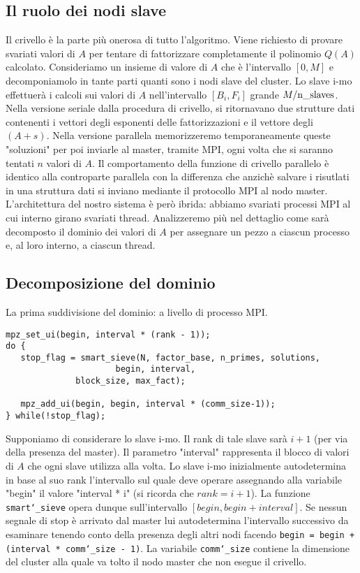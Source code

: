 \subsection{Il ruolo dei nodi slave}
Il crivello è la parte più onerosa di tutto l'algoritmo. Viene
richiesto di provare svariati valori di $A$ per tentare di fattorizzare
completamente il polinomio $Q(A)$ calcolato. Consideriamo un
insieme di valore di $A$ che è l'intervallo $[0, M]$ e decomponiamolo in
tante parti quanti sono i nodi slave del cluster. Lo slave i-mo
effettuerà i calcoli sui valori di $A$ nell'intervallo
$[B_i, F_i]$ grande $M/\mathrm{n\char`_slaves}$. 
Nella versione seriale dalla procedura di crivello, si 
ritornavano due strutture dati contenenti i vettori degli esponenti
delle fattorizzazioni e il vettore degli $(A + s)$. Nella versione
parallela memorizzeremo temporaneamente queste "soluzioni" per poi
inviarle al master, tramite MPI, ogni volta che si saranno tentati $n$ valori
di $A$. Il comportamento della funzione di crivello parallelo è identico
alla controparte parallela con la differenza che anzichè salvare i risutlati
in una struttura dati si inviano mediante il protocollo MPI al nodo
master. L'architettura del nostro sistema è però ibrida: abbiamo svariati
processi MPI al cui interno girano svariati thread. Analizzeremo più nel
dettaglio come sarà decomposto il dominio dei valori di $A$ per
assegnare un pezzo a ciascun processo e, al loro interno, a ciascun
thread.
\subsection{Decomposizione del dominio}
La prima suddivisione del dominio: a livello di processo MPI.
\begin{lstlisting}
mpz_set_ui(begin, interval * (rank - 1));
do {
   stop_flag = smart_sieve(N, factor_base, n_primes, solutions,
                	  begin, interval,
		  	  block_size, max_fact);

   mpz_add_ui(begin, begin, interval * (comm_size-1));
} while(!stop_flag);
\end{lstlisting}
Supponiamo di considerare lo slave i-mo. Il rank di tale slave sarà
$i+1$ (per via della presenza del master). Il parametro "interval"
rappresenta il blocco di valori di $A$ che ogni slave utilizza alla
volta. Lo slave i-mo inizialmente autodetermina in base al suo
rank l'intervallo sul quale deve operare assegnando alla variabile
"begin" il valore "interval * i" (si ricorda che $rank = i + 1$).
La funzione \texttt{smart\char`_sieve} opera dunque sull'intervallo $[begin, begin +
  interval]$. Se nessun segnale di stop è arrivato dal master lui
autodetermina l'intervallo successivo da esaminare tenendo conto della
presenza degli altri nodi facendo \texttt{begin = begin + (interval *
comm\char`_size - 1)}. La variabile \texttt{comm\char`_size} contiene la dimensione del
cluster alla quale va tolto il nodo master che non esegue il crivello.

